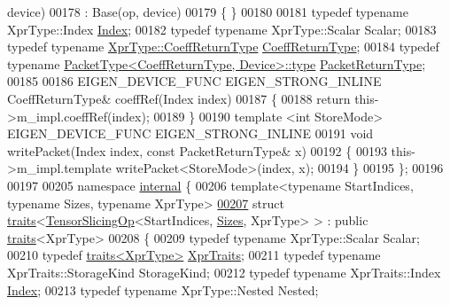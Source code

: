 \begin{DoxyCode}
      device)
00178     : Base(op, device)
00179   \{ \}
00180 
00181   \textcolor{keyword}{typedef} \textcolor{keyword}{typename} XprType::Index \hyperlink{namespace_eigen_a62e77e0933482dafde8fe197d9a2cfde}{Index};
00182   \textcolor{keyword}{typedef} \textcolor{keyword}{typename} XprType::Scalar Scalar;
00183   \textcolor{keyword}{typedef} \textcolor{keyword}{typename} \hyperlink{group___sparse_core___module}{XprType::CoeffReturnType} 
      \hyperlink{group___sparse_core___module}{CoeffReturnType};
00184   \textcolor{keyword}{typedef} \textcolor{keyword}{typename} \hyperlink{group___sparse_core___module}{PacketType<CoeffReturnType, Device>::type} 
      \hyperlink{group___sparse_core___module}{PacketReturnType};
00185 
00186   EIGEN\_DEVICE\_FUNC EIGEN\_STRONG\_INLINE CoeffReturnType& coeffRef(Index index)
00187   \{
00188     \textcolor{keywordflow}{return} this->m\_impl.coeffRef(index);
00189   \}
00190   \textcolor{keyword}{template} <\textcolor{keywordtype}{int} StoreMode> EIGEN\_DEVICE\_FUNC EIGEN\_STRONG\_INLINE
00191   \textcolor{keywordtype}{void} writePacket(Index index, \textcolor{keyword}{const} PacketReturnType& x)
00192   \{
00193     this->m\_impl.template writePacket<StoreMode>(index, x);
00194   \}
00195 \};
00196 
00197 
00205 \textcolor{keyword}{namespace }\hyperlink{namespaceinternal}{internal} \{
00206 \textcolor{keyword}{template}<\textcolor{keyword}{typename} StartIndices, \textcolor{keyword}{typename} Sizes, \textcolor{keyword}{typename} XprType>
\hyperlink{struct_eigen_1_1internal_1_1traits_3_01_tensor_slicing_op_3_01_start_indices_00_01_sizes_00_01_xpr_type_01_4_01_4}{00207} \textcolor{keyword}{struct }\hyperlink{struct_eigen_1_1internal_1_1traits}{traits}<\hyperlink{class_eigen_1_1_tensor_slicing_op}{TensorSlicingOp}<StartIndices, \hyperlink{struct_eigen_1_1_sizes}{Sizes}, XprType> > : \textcolor{keyword}{public} 
      \hyperlink{struct_eigen_1_1internal_1_1traits}{traits}<XprType>
00208 \{
00209   \textcolor{keyword}{typedef} \textcolor{keyword}{typename} XprType::Scalar Scalar;
00210   \textcolor{keyword}{typedef} \hyperlink{struct_eigen_1_1internal_1_1traits}{traits<XprType>} \hyperlink{struct_eigen_1_1internal_1_1traits}{XprTraits};
00211   \textcolor{keyword}{typedef} \textcolor{keyword}{typename} XprTraits::StorageKind StorageKind;
00212   \textcolor{keyword}{typedef} \textcolor{keyword}{typename} XprTraits::Index \hyperlink{namespace_eigen_a62e77e0933482dafde8fe197d9a2cfde}{Index};
00213   \textcolor{keyword}{typedef} \textcolor{keyword}{typename} XprType::Nested Nested;

\end{DoxyCode}
